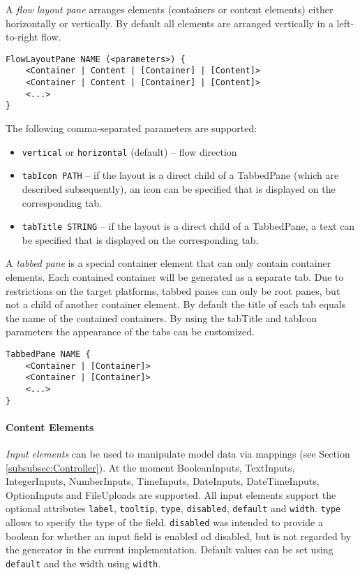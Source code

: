 A \textit{flow layout pane} arranges elements (containers or content elements) either horizontally or vertically. By default all elements are arranged vertically in a left-to-right flow.
\begin{lstlisting}
FlowLayoutPane NAME (<parameters>) {
	<Container | Content | [Container] | [Content]>
	<Container | Content | [Container] | [Content]>
	<...>
}
\end{lstlisting}
The following comma-separated parameters are supported:
\begin{itemize}
\item \lstinline!vertical! or \lstinline!horizontal! (default) -- flow direction
\item \lstinline!tabIcon PATH! -- if the layout is a direct child of a TabbedPane (which are described subsequently), an icon can be specified that is displayed on the corresponding tab.
\item \lstinline!tabTitle STRING! -- if the layout is a direct child of a TabbedPane, a text can be specified that is displayed on the corresponding tab.
\end{itemize}

A \textit{tabbed pane} is a special container element that can only contain container elements. Each contained container will be generated as a separate tab. Due to restrictions on the target platforms, tabbed panes can only be root panes, but not a child of another container element. By default the title of each tab equals the name of the contained containers. By using the tabTitle and tabIcon parameters the appearance of the tabs can be customized.
\begin{lstlisting}
TabbedPane NAME {
	<Container | [Container]>
	<Container | [Container]>
	<...>
}
\end{lstlisting}

\paragraph{Content Elements}
\textit{Input elements} can be used to manipulate model data via mappings (see Section \ref{subsubsec:Controller}). At the moment BooleanInputs, TextInputs, IntegerInputs, NumberInputs, TimeInputs, DateInputs, DateTimeInputs, OptionInputs and FileUploads are supported. All input elements support the optional attributes \lstinline!label!, \lstinline!tooltip!, \lstinline!type!, \lstinline!disabled!, \lstinline!default! and \lstinline!width!. \lstinline!type! allows to specify the type of the field. \lstinline!disabled! was intended to provide a boolean for whether an input field is enabled od disabled, but is not regarded by the generator in the current implementation. Default values can be set using \lstinline!default! and the width using \lstinline!width!.

